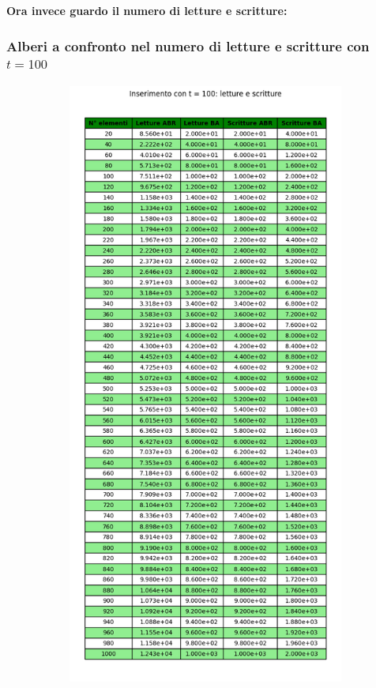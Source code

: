 \textbf{Ora invece guardo il numero di letture e scritture:}

\subsubsection{Alberi a confronto nel numero di letture e scritture con $t = 100$}


\begin{figure}[H]
    \centering
    \begin{subfigure}[b]{0.49\textwidth}
        \centering
        \includegraphics[width=\textwidth]{tables/insert-wr-t100.png}

\end{subfigure}
\end{figure}
